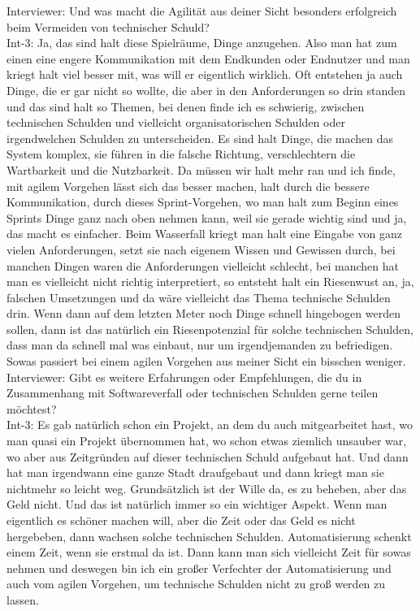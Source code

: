 Interviewer: Und was macht die Agilität aus deiner Sicht besonders erfolgreich beim Vermeiden von technischer Schuld?\\
Int-3: Ja, das sind halt diese Spielräume, Dinge anzugehen. Also man hat zum einen eine engere Kommunikation mit dem Endkunden oder Endnutzer und man kriegt halt viel besser mit, was will er eigentlich wirklich. Oft entstehen ja auch Dinge, die er gar nicht so wollte, die aber in den Anforderungen so drin standen und das sind halt so Themen, bei denen finde ich es schwierig, zwischen technischen Schulden und vielleicht organisatorischen Schulden oder irgendwelchen Schulden zu unterscheiden. Es sind halt Dinge, die machen das System komplex, sie führen in die falsche Richtung, verschlechtern die Wartbarkeit und die Nutzbarkeit. Da müssen wir halt mehr ran und ich finde, mit agilem Vorgehen lässt sich das besser machen, halt durch die bessere Kommunikation, durch dieses Sprint-Vorgehen, wo man halt zum Beginn eines Sprints Dinge ganz nach oben nehmen kann, weil sie gerade wichtig sind und ja, das macht es einfacher. Beim Wasserfall kriegt man halt eine Eingabe von ganz vielen Anforderungen, setzt sie nach eigenem Wissen und Gewissen durch, bei manchen Dingen waren die Anforderungen vielleicht schlecht, bei manchen hat man es vielleicht nicht richtig interpretiert, so entsteht halt ein Riesenwust an, ja, falschen Umsetzungen und da wäre vielleicht das Thema technische Schulden drin. Wenn dann auf dem letzten Meter noch Dinge schnell hingebogen werden sollen, dann ist das natürlich ein Riesenpotenzial für solche technischen Schulden, dass man da schnell mal was einbaut, nur um irgendjemanden zu befriedigen. Sowas passiert bei einem agilen Vorgehen aus meiner Sicht ein bisschen weniger.\\
Interviewer: Gibt es weitere Erfahrungen oder Empfehlungen, die du in Zusammenhang mit Softwareverfall oder technischen Schulden gerne teilen möchtest?\\
Int-3: Es gab natürlich schon ein Projekt, an dem du auch mitgearbeitet hast, wo man quasi ein Projekt übernommen hat, wo schon etwas ziemlich unsauber war, wo aber aus Zeitgründen auf dieser technischen Schuld aufgebaut hat. Und dann hat man irgendwann eine ganze Stadt draufgebaut und dann kriegt man sie nichtmehr so leicht weg. Grundsätzlich ist der Wille da, es zu beheben, aber das Geld nicht. Und das ist natürlich immer so ein wichtiger Aspekt. Wenn man eigentlich es schöner machen will, aber die Zeit oder das Geld es nicht hergebeben, dann wachsen solche technischen Schulden. Automatisierung schenkt einem Zeit, wenn sie erstmal da ist. Dann kann man sich vielleicht Zeit für sowas nehmen und deswegen bin ich ein großer Verfechter der Automatisierung und auch vom agilen Vorgehen, um technische Schulden nicht zu groß werden zu lassen. \\


